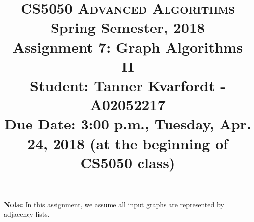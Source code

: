 \documentclass[11pt]{article}
\begin{document}
\baselineskip=14.0pt

\title{CS5050 \textsc{Advanced Algorithms}
\\{\Large Spring Semester, 2018}
\\ Assignment 7: Graph Algorithms II
\\ {\large \textbf{Student:} Tanner Kvarfordt - A02052217}
\\ {\large {\bf Due Date: 3:00 p.m.}, Tuesday, Apr. 24, 2018 ({\bf at the beginning of CS5050 class})}}
\date{}


\maketitle

\vspace{-0.6in}

{\bf Note:} In this assignment, we assume all input graphs are represented by adjacency lists.
\end{document}
